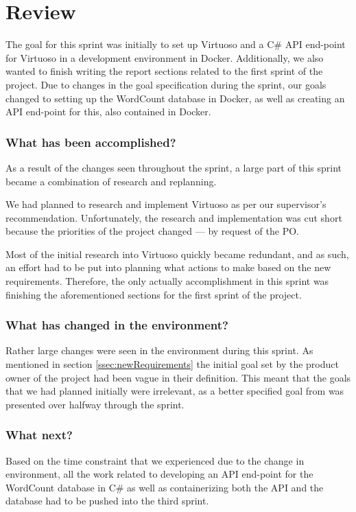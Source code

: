 \section{Review}
The goal for this sprint was initially to set up Virtuoso and a C\# API end-point for Virtuoso in a development environment in Docker. 
Additionally, we also wanted to finish writing the report sections related to the first sprint of the \knox{} project. 
Due to changes in the goal specification during the sprint, our goals changed to setting up the WordCount database in Docker, as well as creating an API end-point for this, also contained in Docker.

\subsubsection*{What has been accomplished?}
As a result of the changes seen throughout the sprint, a large part of this sprint became a combination of research and replanning. 

We had planned to research and implement Virtuoso as per our supervisor's recommendation.
Unfortunately, the research and implementation was cut short because the priorities of the \knox{} project changed --- by request of the PO.

Most of the initial research into Virtuoso quickly became redundant, and as such, an effort had to be put into planning what actions to make based on the new requirements. 
Therefore, the only actually accomplishment in this sprint was finishing the aforementioned sections for the first sprint of the \knox{} project.  



\subsubsection*{What has changed in the environment?}
Rather large changes were seen in the environment during this sprint. As mentioned in section \ref{ssec:newRequirements} the initial goal set by the product owner of the \knox{} project had been vague in their definition. 
This meant that the goals that we had planned initially were irrelevant, as a better specified goal from \knox{} was presented over halfway through the sprint. 

\subsubsection*{What next?}
Based on the time constraint that we experienced due to the change in environment, all the work related to developing an API end-point for the WordCount database in C\# as well as containerizing both the API and the database had to be pushed into the third sprint.
